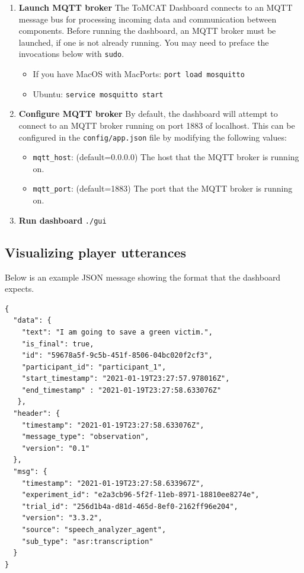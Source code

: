 \begin{enumerate}

    \item \textbf{Launch MQTT broker} The ToMCAT Dashboard connects to an MQTT
        message bus for processing incoming data and communication between
        components. Before running the dashboard, an MQTT broker must be
        launched, if one is not already running.  You may need to preface the
        invocations below with \texttt{sudo}.

        \begin{itemize}
            \item If you have MacOS with MacPorts: \texttt{port load mosquitto}
            \item Ubuntu: \texttt{service mosquitto start}
        \end{itemize}

    \item \textbf{Configure MQTT broker} By default, the dashboard will attempt
        to connect to an MQTT broker running on port 1883 of localhost. This
        can be configured in the \texttt{config/app.json} file by modifying the
        following values:

        \begin{itemize}

            \item \texttt{mqtt\_host}: (default=0.0.0.0) The host that the MQTT broker
                is running on.

            \item \texttt{mqtt\_port}: (default=1883) The port that the MQTT broker is
                running on.

        \end{itemize}

    \item \textbf{Run dashboard} \texttt{./gui}
\end{enumerate}


\subsection{Visualizing player utterances}


Below is an example JSON message showing the format that the dashboard
expects.

\begin{verbatim}
{
  "data": {
    "text": "I am going to save a green victim.",
    "is_final": true,
    "id": "59678a5f-9c5b-451f-8506-04bc020f2cf3",
    "participant_id": "participant_1",
    "start_timestamp": "2021-01-19T23:27:57.978016Z",
    "end_timestamp" : "2021-01-19T23:27:58.633076Z"
   },
  "header": {
    "timestamp": "2021-01-19T23:27:58.633076Z",
    "message_type": "observation",
    "version": "0.1"
  },
  "msg": {
    "timestamp": "2021-01-19T23:27:58.633967Z",
    "experiment_id": "e2a3cb96-5f2f-11eb-8971-18810ee8274e",
    "trial_id": "256d1b4a-d81d-465d-8ef0-2162ff96e204",
    "version": "3.3.2",
    "source": "speech_analyzer_agent",
    "sub_type": "asr:transcription"
  }
}
\end{verbatim}




